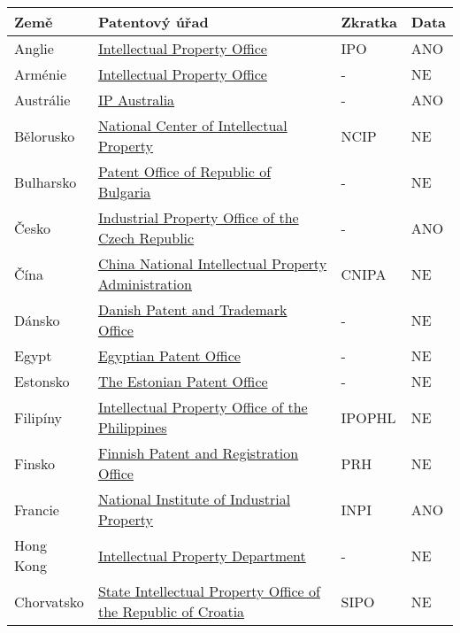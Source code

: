 	\begin{table}[H]
	\centering
	\begin{tabular}{|>{\centering\arraybackslash}p{2.2cm}|>{\centering\arraybackslash}p{7cm}|>{\centering\arraybackslash}p{2cm}|>{\centering\arraybackslash}p{1cm}|} 
	\hline
	\textbf{Země}    & \textbf{Patentový úřad} & \textbf{Zkratka} & \textbf{Data}                \\ 
	\hline
	Anglie & \href{https://www.gov.uk/topic/intellectual-property}{Intellectual Property Office}  & IPO & ANO        \\ 
	\hline
	Arménie & \href{https://www.aipa.am/hy/}{Intellectual Property Office}  & - & NE        \\ 
	\hline
	Austrálie & \href{https://www.ipaustralia.gov.au/}{IP Australia}  & - & ANO         \\ 
	\hline
	Bělorusko & \href{https://www.ncip.by/}{National Center of Intellectual Property}  & NCIP & NE         \\ 
	\hline
	Bulharsko & \href{https://www.bpo.bg/}{Patent Office of Republic of Bulgaria}  & -  & NE       \\ 
	\hline
	Česko & \href{https://upv.gov.cz/}{Industrial Property Office of the Czech Republic}  & -   & ANO      \\ 
	\hline
	Čína & \href{https://www.cnipa.gov.cn/}{China National Intellectual Property Administration}  & CNIPA   & NE      \\ 
	\hline
	Dánsko & \href{https://www.dkpto.org/}{Danish Patent and Trademark Office}  & -    & NE     \\ 
	\hline
	Egypt & \href{http://www.egypo.gov.eg}{Egyptian Patent Office}  & -   & NE      \\ 
	\hline
	Estonsko & \href{https://www.epa.ee/et}{The Estonian Patent Office}  & -   & NE      \\ 
	\hline
	Filipíny & \href{http://www.ipophil.gov.ph/}{Intellectual Property Office of the Philippines}  & IPOPHL & NE        \\ 
	\hline
	Finsko & \href{http://www.prh.fi/en/index.html}{Finnish Patent and Registration Office}  & PRH   & NE      \\ 
	\hline
	Francie & \href{http://www.inpi.fr/}{National Institute of Industrial Property}  & INPI   & ANO      \\ 
	\hline
	Hong Kong & \href{https://www.ipd.gov.hk/index.htm}{Intellectual Property Department}  & -   & NE      \\ 
	\hline
	Chorvatsko & \href{https://www.dziv.hr/}{State Intellectual Property Office of the Republic of Croatia}  & SIPO  & NE       \\ 

\end{tabular}
\end{table}

